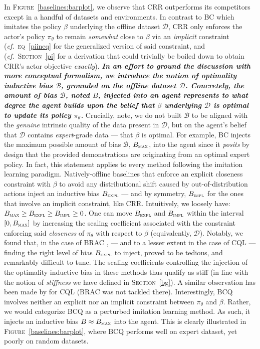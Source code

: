 In \textsc{Figure}~\ref{baselines:barplot},
we observe that CRR
outperforms its competitors except in a handful of datasets and environments.
In contrast to BC which imitates the policy $\beta$ underlying the offline dataset $\mathcal{D}$,
CRR only enforces the actor's policy $\pi_\theta$ to remain \emph{somewhat} close to $\beta$
via an \emph{implicit} constraint (\textit{cf.}~\textsc{eq}~\ref{piineq} for the generalized version of
said constraint, and (\textit{cf.}~\textsc{Section}~\ref{pi} for a derivation that could trivially be boiled down
to obtain CRR's actor objective \textit{exactly}).
\textbf{\emph{In an effort to ground the discussion with more conceptual formalism, we introduce
the notion of \emph{optimality inductive bias} $\mathcal{B}$, grounded on the offline dataset $\mathcal{D}$.
Concretely, the amount of bias $\mathcal{B}$, noted $B$, injected into an agent
represents to what degree the agent builds upon the belief that $\beta$ underlying $\mathcal{D}$
is \emph{optimal} to update its policy $\pi_\theta$.}}
Crucially, note, we do not built $\mathcal{B}$ to be aligned with the
\emph{genuine} intrinsic quality of the data present in $\mathcal{D}$,
but on the agent's belief that $\mathcal{D}$ contains \textit{expert}-grade data
--- that $\beta$ is optimal.
For example, BC
injects the maximum possible amount of bias $\mathcal{B}$,
$B_\textsc{max}$, into the agent since it \emph{posits} by design that the
provided demonstrations are originating from an optimal expert policy.
In fact, this statement applies to every method following the
imitation learning paradigm.
Natively-offline baselines that enforce an explicit closeness constraint with $\beta$ to avoid any
distributional shift caused by out-of-distribution actions inject an inductive bias $B_\textsc{expl}$
--- and by symmetry,
$B_\textsc{impl}$ for the ones that involve an implicit constraint, like CRR.
Intuitively, we loosely have: $B_\textsc{max} \geq B_\textsc{expl} \geq B_\textsc{impl} \geq 0$.
One can move $B_\textsc{expl}$ and $B_\textsc{impl}$ within the interval
$[0, B_\textsc{max}]$ by increasing the scaling coefficient associated with the constraint enforcing
said \textit{closeness} of $\pi_\theta$ with respect to $\beta$ (equivalently, $\mathcal{D}$).
Notably, we found that, in the case of BRAC \cite{Wu2019-nl},
--- and to a lesser extent in the case of CQL \cite{Kumar2020-zb} ---
finding the right level of bias $B_\textsc{expl}$ to inject,
proved to be tedious, and remarkably difficult to tune.
The scaling coefficients controlling the injection of the optimality inductive bias in these methods
thus qualify as stiff (in line with the notion of \emph{stiffness} we have defined in \textsc{Section}~\ref{bg}).
A similar observation has been made by \cite{Monier2020-tq} for CQL (BRAC was not tackled there).
Interestingly, BCQ \cite{Fujimoto2018-mj}
involves neither an explicit nor an implicit constraint between $\pi_\theta$ and $\beta$.
Rather, we would categorize BCQ as a perturbed imitation learning method.
As such, it injects an inductive bias $B \approx B_\textsc{max}$ into the agent.
This is clearly illustrated in \textsc{Figure}~\ref{baselines:barplot}, where BCQ
performs well on expert dataset, yet poorly on random datasets.


